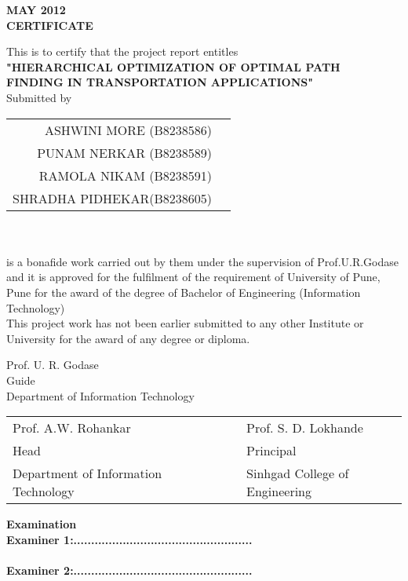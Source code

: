 
\begin{center}
{ \bf MAY 2012}\\[6 mm]
{\large \bf CERTIFICATE }
\end{center}
\begin{center}
This is to certify that the project report entitles \\[4mm]

{\bf  "HIERARCHICAL OPTIMIZATION OF OPTIMAL PATH\\
 FINDING IN TRANSPORTATION APPLICATIONS" }\\[4mm]
Submitted by
\end{center} 
 

	\centering
		\begin{tabular}{rl}
		ASHWINI MORE (B8238586) \\
		PUNAM NERKAR (B8238589) \\
		RAMOLA NIKAM (B8238591) \\
		SHRADHA PIDHEKAR(B8238605) \\
		\end{tabular}\\
		
\vspace{10mm}\\
\justifying
is a bonafide work carried out by them under the supervision of Prof.U.R.Godase and it is approved for the fulfilment of the requirement of University of Pune, Pune for the award of the degree of Bachelor of Engineering (Information Technology)\\[5mm]
This project work has not been earlier submitted to any other Institute or University for the award of any degree or diploma. \\

	\begin{flushleft}
	Prof. U. R. Godase\\ 	
	Guide\\
	Department of Information Technology
		
\end{flushleft}
	
		\vspace{10mm}
		
		\begin{tabular}{lllll}
	Prof. A.W. Rohankar&&&&	Prof. S. D. Lokhande\\
	Head&&&&	Principal	\\
	Department of Information Technology&&&&	Sinhgad College of Engineering

		\end{tabular}

\vspace{5mm}

\begin{flushleft}
\textbf{Examination}\\
\textbf{Examiner 1:...................................................}\\
\\
\textbf{Examiner 2:...................................................}\\
\end{flushleft}



